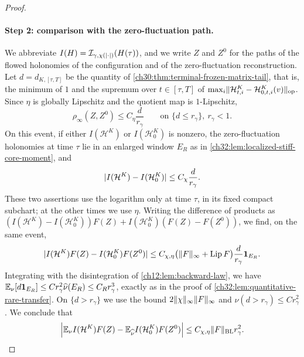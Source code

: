 \begin{proof}
\paragraph{Step 2: comparison with the zero-fluctuation path.}
We abbreviate $I(H)=\mathcal I_{\gamma,\chi(\lvert \cdot\rvert)}(H(\tau))$, and we write $Z$ and $Z^0$ for the paths of the flowed holonomies of the configuration and of the zero-fluctuation reconstruction. Let $d=d_{K,[\tau,T]}$ be the quantity of \cref{ch30:thm:terminal-frozen-matrix-tail}, that is, the minimum of $1$ and the supremum over $t\in[\tau,T]$ of $\max_i\lVert \mathcal H^K_{t,i}-\mathcal H^K_{0,t,i}(v)\rVert_{\mathrm{op}}$. Since $\eta$ is globally Lipschitz and the quotient map is $1$-Lipschitz,
\[
 \rho_\infty(Z,Z^0)\le C_\eta\frac d{r_\gamma}\qquad\text{on }\{d\le r_\gamma\},\ r_\gamma<1.
\]
On this event, if either $I(\mathcal H^K)$ or $I(\mathcal H^K_0)$ is nonzero, the zero-fluctuation holonomies at time $\tau$ lie in an enlarged window $E_R$ as in \cref{ch32:lem:localized-stiff-core-moment}, and
\[
 \lvert I(\mathcal H^K)-I(\mathcal H^K_0)\rvert\le C_\chi\frac d{r_\gamma}.
\]
These two assertions use the logarithm only at time $\tau$, in its fixed compact subchart; at the other times we use $\eta$. Writing the difference of products as $(I(\mathcal H^K)-I(\mathcal H^K_0))F(Z)+I(\mathcal H^K_0)(F(Z)-F(Z^0))$, we find, on the same event,
\[
 \lvert I(\mathcal H^K)F(Z)-I(\mathcal H^K_0)F(Z^0)\rvert\le C_{\chi,\eta}\bigl(\lVert F\rVert_\infty+\operatorname{Lip} F\bigr)\frac d{r_\gamma}\mathbf 1_{E_R}.
\]
Integrating with the disintegration of \cref{ch12:lem:backward-law}, we have $\mathbb E_\nu[d\mathbf 1_{E_R}]\le Cr_\gamma^2\widehat\nu(E_R)\le C_Rr_\gamma^3$, exactly as in the proof of \cref{ch32:lem:quantitative-rare-transfer}. On $\{d>r_\gamma\}$ we use the bound $2\lVert \chi\rVert_\infty\lVert F\rVert_\infty$ and $\nu(d>r_\gamma)\le Cr_\gamma^2$. We conclude that
\begin{equation}\label{ch32:eq:path-transfer}
 \Bigl\lvert\mathbb E_\nu I(\mathcal H^K)F(Z)-\mathbb E_{\widehat\nu}I(\mathcal H^K_0)F(Z^0)\Bigr\rvert\le C_{\chi,\eta}\lVert F\rVert_{\mathrm{BL}}r_\gamma^2.
\end{equation}


\end{proof}
